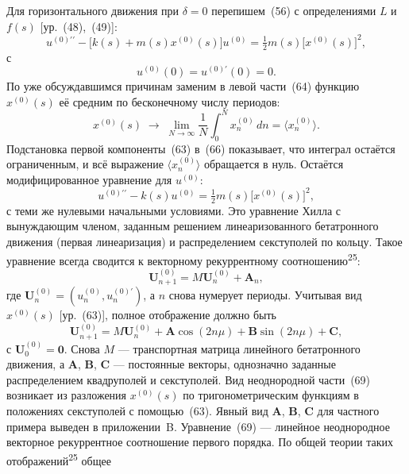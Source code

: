 \documentclass[11pt,a4paper]{article}
\begin{document}
Для горизонтального движения при $\delta=0$ перепишем~(56) с определениями $L$ и
$f(s)$ [ур.~(48),~(49)]:
\begin{equation}
u^{(0)\prime\prime}-\bigl[k(s)+m(s)x^{(0)}(s)\bigr]u^{(0)}
=\tfrac12 m(s)\bigl[x^{(0)}(s)\bigr]^2,
\end{equation}
с
\begin{equation}
u^{(0)}(0)=u^{(0)\prime}(0)=0.
\end{equation}
По уже обсуждавшимся причинам заменим в левой части~(64) функцию $x^{(0)}(s)$ её
средним по бесконечному числу периодов:
\begin{equation}
x^{(0)}(s)\;\longrightarrow\;
\lim_{N\to\infty}\frac1N\int_0^N x_n^{(0)}\,dn=\langle x_n^{(0)}\rangle.
\end{equation}
Подстановка первой компоненты~(63) в~(66) показывает, что интеграл остаётся
ограниченным, и всё выражение $\langle x_n^{(0)}\rangle$ обращается в нуль.
Остаётся модифицированное уравнение для $u^{(0)}$:
\begin{equation}
u^{(0)\prime\prime}-k(s)u^{(0)}=\tfrac12 m(s)\bigl[x^{(0)}(s)\bigr]^2,
\end{equation}
с теми же нулевыми начальными условиями. Это уравнение Хилла с вынуждающим
членом, заданным решением линеаризованного бетатронного движения (первая
линеаризация) и распределением секступолей по кольцу. Такое уравнение всегда
сводится к векторному рекуррентному соотношению\textsuperscript{25}:
\begin{equation}
\mathbf{U}_{n+1}^{(0)}=M\mathbf{U}_n^{(0)}+\mathbf{A}_n,
\end{equation}
где $\mathbf{U}_n^{(0)}=(u_n^{(0)},u_n^{(0)\prime})$, а $n$ снова нумерует периоды.
Учитывая вид $x^{(0)}(s)$ [ур.~(63)], полное отображение должно быть
\begin{equation}
\mathbf{U}_{n+1}^{(0)}=M\mathbf{U}_n^{(0)}
+\mathbf{A}\cos(2n\mu)+\mathbf{B}\sin(2n\mu)+\mathbf{C},
\end{equation}
с $\mathbf{U}_0^{(0)}=\mathbf{0}$. Снова $M$ --- транспортная матрица линейного
бетатронного движения, а $\mathbf{A}$, $\mathbf{B}$, $\mathbf{C}$ --- постоянные
векторы, однозначно заданные распределением квадруполей и секступолей. Вид
неоднородной части~(69) возникает из разложения $x^{(0)}(s)$ по тригонометрическим
функциям в положениях секступолей с помощью~(63). Явный вид $\mathbf{A}$,
$\mathbf{B}$, $\mathbf{C}$ для частного примера выведен в приложении~B.
Уравнение~(69) --- линейное неоднородное векторное рекуррентное соотношение
первого порядка. По общей теории таких отображений\textsuperscript{25} общее
\end{document}
